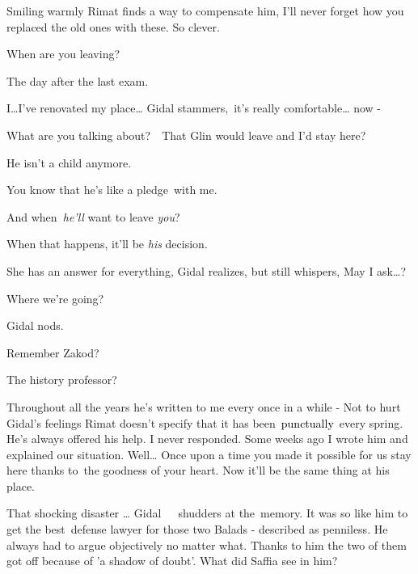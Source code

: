 \documentclass[letterpaper]{article}
\begin{document}
Smiling warmly Rimat finds a way to compensate him, {\textquotedbl}I'll never forget how you replaced the old ones with
these. So clever.{\textquotedbl} 

{\textquotedbl}When are you leaving?{\textquotedbl} 

{\textquotedbl}The day after the last exam.{\textquotedbl} 

{\textquotedbl}I{\dots}I've renovated my place{\dots}{\textquotedbl} Gidal stammers,~{\textquotedbl}it's really
comfortable{\dots} now - {\textquotedbl} 

{\textquotedbl}What are you talking about?\ \ That Glin would leave and I'd stay here?{\textquotedbl} 

{\textquotedbl}He isn't a child anymore.{\textquotedbl} 

{\textquotedbl}You know that he's like a pledge\textcolor{red}{\ }with me.{\textquotedbl} 

{\textquotedbl}And when\textit{\ he'll} want to leave \textit{you}?{\textquotedbl} 

{\textquotedbl}When that happens, it'll be \textit{his} decision.{\textquotedbl} 

She has an answer for everything, Gidal realizes, but still whispers, {\textquotedbl}May I ask{\dots}?{\textquotedbl} 

{\textquotedbl}Where we're going?{\textquotedbl} 

Gidal nods. 

{\textquotedbl}Remember Zakod?{\textquotedbl} 

{\textquotedbl}The history professor?{\textquotedbl} 

{\textquotedbl}Throughout all the years he's written to me every once in a while -{\textquotedbl} Not to hurt Gidal's
feelings Rimat doesn't specify that it has been\textcolor{red}{\ }\textcolor{black}{punctually}\textcolor{red}{\ }every
spring. {\textquotedbl}He's always offered his help. I never responded. Some weeks ago I wrote him and explained our
situation. Well{\dots} Once upon a time you made it possible for us stay here thanks to\textcolor{red}{\ }the goodness
of your heart. Now it'll be the same thing at his place.{\textquotedbl} 

{\textquotedbl}That shocking disaster {\dots}{\textquotedbl} Gidal\textcolor{red}{\ \ \ }shudders at
the\textcolor{red}{\ }memory. {\textquotedbl}It was so like him to get the best~defense lawyer for those two Balads -
described as penniless. He always had to argue objectively no matter what. Thanks to him the two of them got off
because of 'a shadow of doubt'. What did Saffia see in him?{\textquotedbl} 
\end{document}
